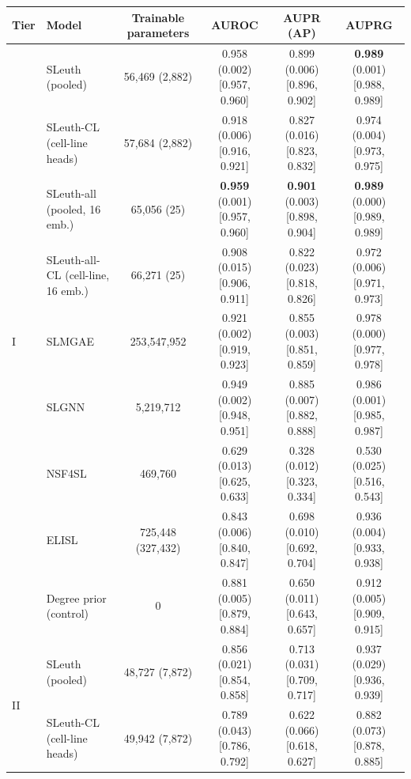 \begin{tabular}{ll|cccc}
\hline
Tier & Model & Trainable parameters & AUROC & AUPR (AP) & AUPRG \\
\hline
\multirow{9}{*}{I} & SLeuth (pooled) & 56{,}469 (2{,}882) & 0.958 (0.002) {\scriptsize [0.957, 0.960]} & 0.899 (0.006) {\scriptsize [0.896, 0.902]} & \textbf{0.989} (0.001) {\scriptsize [0.988, 0.989]} \\
 & SLeuth-CL (cell-line heads) & 57{,}684 (2{,}882) & 0.918 (0.006) {\scriptsize [0.916, 0.921]} & 0.827 (0.016) {\scriptsize [0.823, 0.832]} & 0.974 (0.004) {\scriptsize [0.973, 0.975]} \\
 & SLeuth-all (pooled, 16 emb.) & 65{,}056 (25) & \textbf{0.959} (0.001) {\scriptsize [0.957, 0.960]} & \textbf{0.901} (0.003) {\scriptsize [0.898, 0.904]} & \textbf{0.989} (0.000) {\scriptsize [0.989, 0.989]} \\
 & SLeuth-all-CL (cell-line, 16 emb.) & 66{,}271 (25) & 0.908 (0.015) {\scriptsize [0.906, 0.911]} & 0.822 (0.023) {\scriptsize [0.818, 0.826]} & 0.972 (0.006) {\scriptsize [0.971, 0.973]} \\
 & SLMGAE & 253{,}547{,}952 & 0.921 (0.002) {\scriptsize [0.919, 0.923]} & 0.855 (0.003) {\scriptsize [0.851, 0.859]} & 0.978 (0.000) {\scriptsize [0.977, 0.978]} \\
 & SLGNN & 5{,}219{,}712 & 0.949 (0.002) {\scriptsize [0.948, 0.951]} & 0.885 (0.007) {\scriptsize [0.882, 0.888]} & 0.986 (0.001) {\scriptsize [0.985, 0.987]} \\
 & NSF4SL & 469{,}760 & 0.629 (0.013) {\scriptsize [0.625, 0.633]} & 0.328 (0.012) {\scriptsize [0.323, 0.334]} & 0.530 (0.025) {\scriptsize [0.516, 0.543]} \\
 & ELISL & 725{,}448 (327{,}432) & 0.843 (0.006) {\scriptsize [0.840, 0.847]} & 0.698 (0.010) {\scriptsize [0.692, 0.704]} & 0.936 (0.004) {\scriptsize [0.933, 0.938]} \\
 & Degree prior (control) & 0 & 0.881 (0.005) {\scriptsize [0.879, 0.884]} & 0.650 (0.011) {\scriptsize [0.643, 0.657]} & 0.912 (0.005) {\scriptsize [0.909, 0.915]} \\
\hline
\multirow{9}{*}{II} & SLeuth (pooled) & 48{,}727 (7{,}872) & 0.856 (0.021) {\scriptsize [0.854, 0.858]} & 0.713 (0.031) {\scriptsize [0.709, 0.717]} & 0.937 (0.029) {\scriptsize [0.936, 0.939]} \\
 & SLeuth-CL (cell-line heads) & 49{,}942 (7{,}872) & 0.789 (0.043) {\scriptsize [0.786, 0.792]} & 0.622 (0.066) {\scriptsize [0.618, 0.627]} & 0.882 (0.073) {\scriptsize [0.878, 0.885]} \\

\end{tabular}
